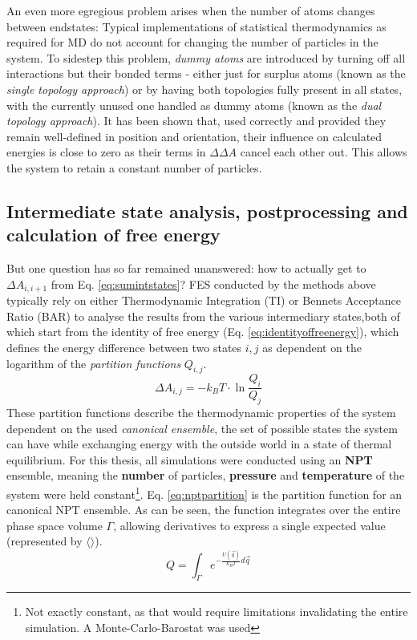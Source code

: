\documentclass[oneside]{scrreprt}
\begin{document}
An even more egregious problem arises when the number of atoms changes between endstates: Typical implementations of statistical thermodynamics as required for MD do not account for changing the number of particles in the system. To sidestep this problem, \emph{dummy atoms} are introduced by turning off all interactions but their bonded terms - either just for surplus atoms (known as the \emph{single topology approach}) or by having both topologies fully present in all states, with the currently unused one handled as dummy atoms (known as the \emph{dual topology approach}). It has been shown that, used correctly and provided they remain well-defined in position and orientation, their influence on calculated energies is close to zero as their terms in $\Delta \Delta A$  cancel each other out\cite{fleckDummyAtomsAlchemical2021}. This allows the system to retain a constant number of particles.

\subsection{Intermediate state analysis, postprocessing and calculation of free energy}

But one question has so far remained unanswered: how to actually get to $\Delta A_{i,i+1}$ from Eq. \ref{eq:sumintstates}? 
FES conducted by the methods above typically rely on either Thermodynamic Integration (TI) \cite{straatsma_free_1986} or Bennets Acceptance Ratio (BAR) \cite{Bennett1976Oct,shirts_statistically_2008} to analyse the results from the various intermediary states,both of which start from the identity of free energy (Eq. \ref{eq:identityoffreenergy}), which defines the energy difference between two states $i,j$ as dependent on the logarithm of the \emph{partition functions} $Q_{i,j}$.
\begin{equation} \label{eq:identityoffreenergy}
    \Delta A_{i,j}=-k_{B}T\cdot \ln\frac{Q_i}{Q_j}
\end{equation}
These partition functions describe the thermodynamic properties of the system dependent on the used \emph{canonical ensemble}, the set of possible states the system can have while exchanging energy with the outside world in a state of thermal equilibrium. For this thesis, all simulations were conducted using an \textbf{NPT} ensemble, meaning the \textbf{number} of particles, \textbf{pressure} and \textbf{temperature} of the system were held constant\footnote{Not exactly constant, as that would require limitations invalidating the entire simulation. A Monte-Carlo-Barostat was used}. Eq. \ref{eq:nptpartition} is the partition function for an canonical NPT ensemble. As can be seen, the function integrates over the entire phase space volume $\Gamma$, allowing derivatives to express a single expected value (represented by $\langle \rangle$).
\begin{equation} \label{eq:nptpartition}
    Q=\int_\Gamma e^{-\frac{U(\Vec{q})}{k_B T}d\Vec{q}}
\end{equation}
\end{document}
